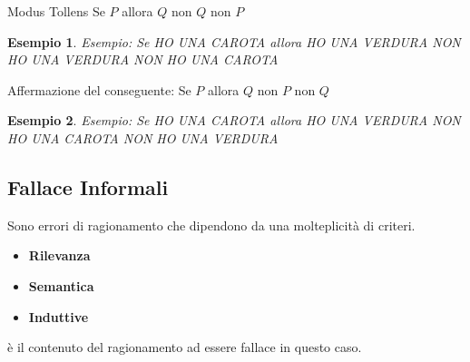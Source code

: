 \documentclass[../main.tex, class=article, 12pt]{subfiles}
\newtheorem{exmp}{Esempio}[section]
\theoremstyle{definition}
\begin{document}
\begin{tcolorbox}
        Modus Tollens\newline 
        Se $ P $ allora $ Q $ \newline
        non $ Q $ \newline 
        non $ P $ \newline
\end{tcolorbox}
\begin{exmp}
        Esempio: \newline
        Se HO UNA CAROTA allora HO UNA VERDURA \newline
        NON HO UNA VERDURA \newline 
        NON HO UNA CAROTA \newline
\end{exmp}

\begin{tcolorbox}
        Affermazione del conseguente: \newline
        Se $ P $ allora $ Q $ \newline
        non $ P $ \newline
        non $ Q $ \newline 
\end{tcolorbox}
\begin{exmp}
        Esempio: \newline
        Se HO UNA CAROTA allora HO UNA VERDURA \newline
        NON HO UNA CAROTA \newline
        NON HO UNA VERDURA \newline 
\end{exmp}



\subsection{Fallace Informali}
Sono errori di ragionamento che dipendono da una molteplicità di criteri. \par
\begin{itemize}
        \item \textbf{Rilevanza}
        \item \textbf{Semantica}
        \item\textbf{Induttive}
\end{itemize}
è il contenuto del ragionamento ad essere fallace in questo caso.
\end{document}
